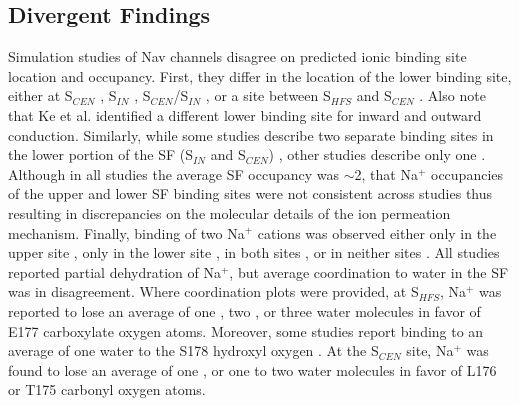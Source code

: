 \begin{refsection}
 \subsection{Divergent Findings}
 Simulation studies of Nav channels disagree on predicted ionic binding site location and occupancy.  First, they differ in the location of the lower binding site, either at S$_{CEN}$ \cite{Corry:2012ge,Stock:2013cg,Domene:2015kj,Furini:2014gv,Furini:2012jl,Ke:2013ub,Ke:2014fy}, S$_{IN}$ \cite{Boiteux:2014ut,FinolUrdaneta:2014bz}, S$_{CEN}$/S$_{IN}$ \cite{Ulmschneider:2013da,Carnevale:2011kp}, or a site between S$_{HFS}$ and S$_{CEN}$ \cite{Ke:2014fy,Chakrabarti:2013kd}. Also note that Ke et al. \cite{Ke:2014fy} identified a different lower binding site for inward and outward conduction.  Similarly, while some studies describe two separate binding sites in the lower portion of the SF (S$_{IN}$ and S$_{CEN}$) \cite{Corry:2012ge,Boiteux:2014ut,Stock:2013cg,Ke:2014fy,Ke:2013ub}, other studies describe only one \cite{Domene:2015kj,Furini:2012jl,Ulmschneider:2013da,Furini:2014gv,Chakrabarti:2013kd}.  Although in all studies the average SF occupancy was $\sim$2, that Na$^{+}$ occupancies of the upper and lower SF binding sites were not consistent across studies thus resulting in discrepancies on the molecular details of the ion permeation mechanism.  Finally, binding of two Na$^{+}$ cations was observed either only in the upper site \cite{Boiteux:2014ut,Corry:2012ge,Furini:2012jl}, only in the lower site \cite{Chakrabarti:2013kd,Carnevale:2011kp,FinolUrdaneta:2014bz}, in both sites \cite{Stock:2013cg,Domene:2015kj}, or in neither sites \cite{Ulmschneider:2013da}.
All studies reported partial dehydration of Na$^{+}$, but average coordination to water in the SF was in disagreement.  Where coordination plots were provided, at S$_{HFS}$, Na$^{+}$ was reported to lose an average of one \cite{Ke:2014fy,Ulmschneider:2013da,Corry:2012ge,Furini:2012hd}, two \cite{FinolUrdaneta:2014bz}, or three water molecules \cite{Chakrabarti:2013kd} in favor of E177 carboxylate oxygen atoms. Moreover, some studies report binding to an average of one water to the S178 hydroxyl oxygen \cite{Corry:2012ge,FinolUrdaneta:2014bz,Boiteux:2014ut,Furini:2012jl}. At the S$_{CEN}$ site, Na$^{+}$ was found to lose an average of one \cite{Corry:2012ge,FinolUrdaneta:2014bz,Boiteux:2014ut,Furini:2012jl}, or one to two water molecules \cite{Ulmschneider:2013da,Chakrabarti:2013kd} in favor of L176 or T175 carbonyl oxygen atoms.

\end{refsection}
